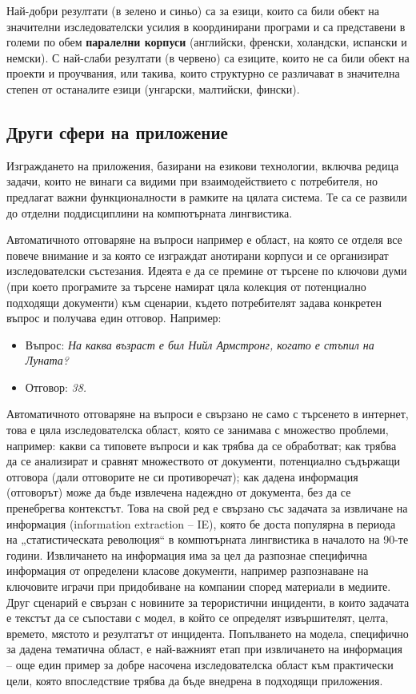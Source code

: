 \begin{multicols}{2}
  Най-добри резултати (в зелено и синьо) са за езици, които са били обект на значителни изследователски усилия в координирани програми и са представени в големи по обем \textbf{паралелни корпуси} (английски, френски, холандски, испански и немски). С най-слаби резултати (в червено) са езиците, които не са били обект на проекти и проучвания, или такива, които структурно се различават в значителна степен от останалите езици (унгарски, малтийски, фински).

  \subsection{Други сфери на приложение}

  Изграждането на приложения, базирани на езикови технологии, включва редица задачи, които не винаги са видими при взаимодействието с потребителя,
   но предлагат важни функционалности в рамките на цялата система. Те са се развили до отделни поддисциплини на компютърната лингвистика.

  Автоматичното отговаряне на въпроси например е област, на която се отделя все повече внимание и за която се изграждат анотирани корпуси и се организират изследователски състезания. Идеята е да се премине от търсене по ключови думи (при което програмите за търсене намират цяла колекция от потенциално
   подходящи документи) към сценарии, където потребителят задава конкретен въпрос и получава един отговор. Например: 

  \begin{itemize}
  \item[] Въпрос: \textit{На каква възраст е бил Нийл Армстронг, когато е стъпил на Луната?}
  \item[] Отговор: \textit{38.}
  \end{itemize}

  Автоматичното отговаряне на въпроси е свързано не само с търсенето в интернет, това е цяла изследователска област, която се занимава с множество проблеми, например: какви са типовете въпроси и как трябва да се обработват; как трябва да се анализират и сравнят множеството от документи, потенциално
   съдържащи отговора (дали отговорите не си противоречат); как
  дадена информация (отговорът) може да бъде извлечена  надеждно от документа, без да се пренебрегва контекстът.
  Това на свой ред е свързано със задачата за извличане на информация (information extraction -- IE), която бе доста популярна в периода на „статистическата революция“ в компютърната лингвистика в началото на 90-те години. Извличането на информация има за цел да разпознае специфична информация от определени класове документи, например разпознаване на ключовите играчи при
   придобиване на компании според материали в медиите. Друг сценарий е свързан с новините за терористични инциденти, в които задачата е текстът да се съпостави  с модел, в който се определят извършителят, целта, времето, мястото и резултатът от инцидента. Попълването на модела, специфично за дадена тематична област, е най-важният етап при извличането на информация – още
   един пример за добре насочена изследователска област към практически цели, която впоследствие трябва да бъде внедрена в подходящи приложения.


\end{multicols}
